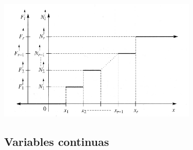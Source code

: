 \documentclass[]{article}
\begin{document}
\begin{itemize}
\begin{minipage}[t]{.6\linewidth}
		\end{minipage}%
		\begin{minipage}[t]{.45\linewidth}
			\vspace*{0pt}
			\raggedleft
			\begin{center}
				\includegraphics[scale = 0.5]{distrib_discreta}
			\end{center}
		\end{minipage}
	\end{itemize}
	
	\subsection{Variables continuas}
	
\end{document}
